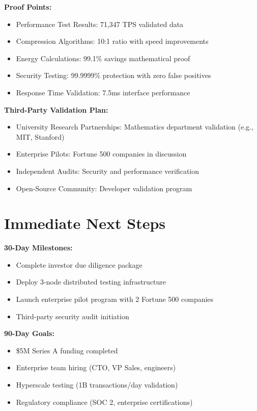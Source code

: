 \documentclass{article}
\begin{document}
\textbf{Proof Points:}
\begin{itemize}
    \item Performance Test Results: 71,347 TPS validated data
    \item Compression Algorithms: 10:1 ratio with speed improvements
    \item Energy Calculations: 99.1\% savings mathematical proof
    \item Security Testing: 99.9999\% protection with zero false positives
    \item Response Time Validation: 7.5ms interface performance
\end{itemize}

\textbf{Third-Party Validation Plan:}
\begin{itemize}
    \item University Research Partnerships: Mathematics department validation (e.g., MIT, Stanford)
    \item Enterprise Pilots: Fortune 500 companies in discussion
    \item Independent Audits: Security and performance verification
    \item Open-Source Community: Developer validation program
\end{itemize}

\section{Immediate Next Steps}
\textbf{30-Day Milestones:}
\begin{itemize}
    \item Complete investor due diligence package
    \item Deploy 3-node distributed testing infrastructure
    \item Launch enterprise pilot program with 2 Fortune 500 companies
    \item Third-party security audit initiation
\end{itemize}

\textbf{90-Day Goals:}
\begin{itemize}
    \item \$5M Series A funding completed
    \item Enterprise team hiring (CTO, VP Sales, engineers)
    \item Hyperscale testing (1B transactions/day validation)
    \item Regulatory compliance (SOC 2, enterprise certifications)
\end{itemize}
\end{document}
